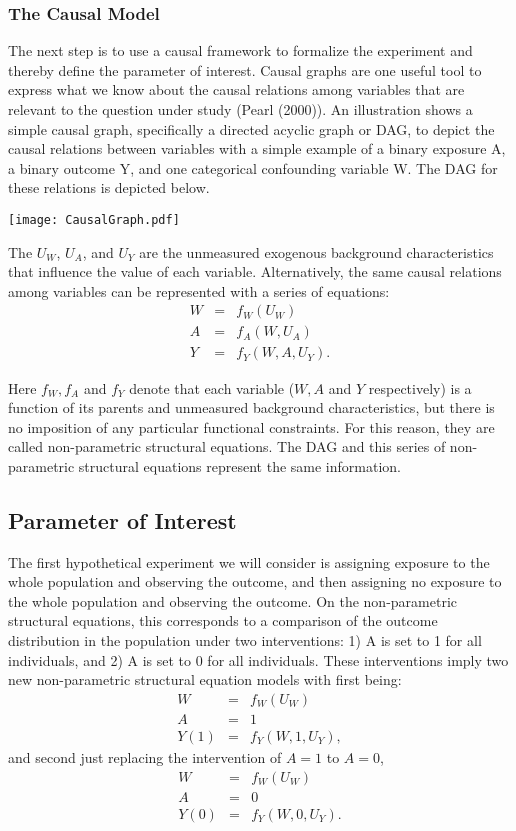 \documentclass[]{article}
\begin{document}
\hypertarget{the-causal-model}{%
\subsubsection{The Causal Model}\label{the-causal-model}}

The next step is to use a causal framework to formalize the experiment
and thereby define the parameter of interest. Causal graphs are one
useful tool to express what we know about the causal relations among
variables that are relevant to the question under study (Pearl (2000)).
An illustration shows a simple causal graph, specifically a directed
acyclic graph or DAG, to depict the causal relations between variables
with a simple example of a binary exposure A, a binary outcome Y, and
one categorical confounding variable W. The DAG for these relations is
depicted below.

\texttt{[image: CausalGraph.pdf]}

The \(U_W\), \(U_A\), and \(U_Y\) are the unmeasured exogenous
background characteristics that influence the value of each variable.
Alternatively, the same causal relations among variables can be
represented with a series of equations: \begin{eqnarray*}
W &=& f_W(U_W) \\
A &=& f_A(W,U_A) \\
Y&=&f_Y(W,A,U_Y). 
\end{eqnarray*}

Here \(f_W, f_A\) and \(f_Y\) denote that each variable (\(W, A\) and
\(Y\) respectively) is a function of its parents and unmeasured
background characteristics, but there is no imposition of any particular
functional constraints. For this reason, they are called non-parametric
structural equations. The DAG and this series of non-parametric
structural equations represent the same information.

\hypertarget{parameter-of-interest}{%
\subsection{Parameter of Interest}\label{parameter-of-interest}}

The first hypothetical experiment we will consider is assigning exposure
to the whole population and observing the outcome, and then assigning no
exposure to the whole population and observing the outcome. On the
non-parametric structural equations, this corresponds to a comparison of
the outcome distribution in the population under two interventions: 1) A
is set to 1 for all individuals, and 2) A is set to 0 for all
individuals. These interventions imply two new non-parametric structural
equation models with first being: \begin{eqnarray*}
W &=& f_W(U_W) \\
A &=& 1 \\
Y(1)&=&f_Y(W,1,U_Y), 
\end{eqnarray*} and second just replacing the intervention of \(A=1\) to
\(A=0\), \begin{eqnarray*}
W &=& f_W(U_W) \\
A &=& 0 \\
Y(0)&=&f_Y(W,0,U_Y).
\end{eqnarray*}
\end{document}
